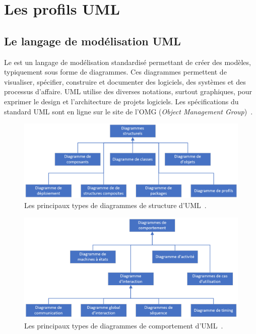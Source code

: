 \chapter{Les profils UML}
\label{chap.profils-UML}
\section{Le langage de modélisation UML}

Le  est un langage de modélisation standardisé permettant de créer des mod\`eles, typiquement sous forme de diagrammes.
Ces diagrammes permettent de visualiser, spécifier, construire et documenter des logiciels, des systèmes et des processus d'affaire.
UML utilise des diverses notations,  surtout graphiques, pour exprimer le design et l'architecture de projets logiciels.
Les spécifications du standard UML sont en ligne sur le site de l'OMG (\emph{Object Management Group})~\cite{OMG_UML}.


\begin{figure}
    \centering
    \includegraphics[width=12cm]{10_img/chap4/structure.PNG}
    \caption{Les principaux types de diagrammes de structure d'UML~\cite{OMG_UML}.}
    \label{fig.uml_struc}
\end{figure}

\begin{figure}
    \centering
    \includegraphics[width=12cm]{10_img/chap4/comportement.PNG}
    \caption{Les principaux types de diagrammes de comportement d'UML~\cite{OMG_UML}.}
    \label{fig.uml_comp}
\end{figure}


